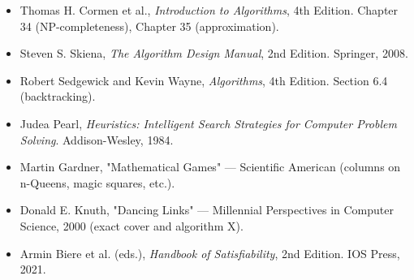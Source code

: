 \begin{itemize}
\item Thomas H. Cormen et al., \textit{Introduction to Algorithms}, 4th Edition. Chapter 34 (NP-completeness), Chapter 35 (approximation).
\item Steven S. Skiena, \textit{The Algorithm Design Manual}, 2nd Edition. Springer, 2008.
\item Robert Sedgewick and Kevin Wayne, \textit{Algorithms}, 4th Edition. Section 6.4 (backtracking).
\item Judea Pearl, \textit{Heuristics: Intelligent Search Strategies for Computer Problem Solving}. Addison-Wesley, 1984.
\item Martin Gardner, "Mathematical Games" — Scientific American (columns on n-Queens, magic squares, etc.).
\item Donald E. Knuth, "Dancing Links" — Millennial Perspectives in Computer Science, 2000 (exact cover and algorithm X).
\item Armin Biere et al. (eds.), \textit{Handbook of Satisfiability}, 2nd Edition. IOS Press, 2021.
\end{itemize}

